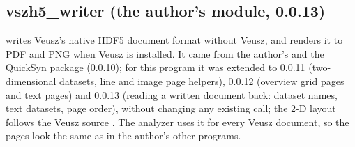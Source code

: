 \documentclass[10pt,letterpaper]{article}
\numberwithin{equation}{section}
\begin{document}
\subsection{vszh5\_writer (the author's module, 0.0.13)}\label{app:writer}
 writes Veusz's native HDF5 document format without
Veusz, and renders it to PDF and PNG when Veusz is installed. It came from the
author's  and the QuickSyn package (0.0.10); for this
program it was extended to 0.0.11 (two-dimensional datasets, line and image
page helpers), 0.0.12 (overview grid pages and text pages) and 0.0.13 (reading
a written document back: dataset names, text datasets, page order), without
changing any existing call; the 2-D layout follows the Veusz source \cite{B29}. The analyzer uses it for every
Veusz document, so the pages look the same as in the author's other programs.
\end{document}
